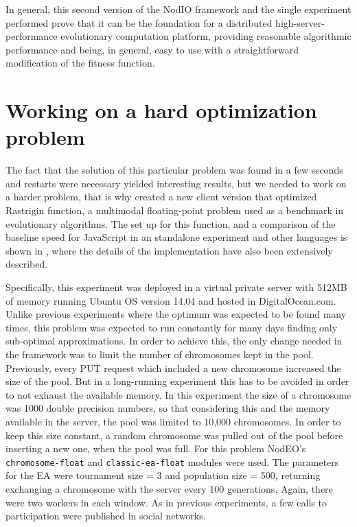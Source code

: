 \documentclass[journal,onecolumn]{IEEEtran}
\begin{document}
In general, this second version of the {\sf NodIO} framework and the
single experiment performed prove that it can be the foundation for a distributed
high-server-performance evolutionary computation platform,
providing reasonable algorithmic performance and being, in general,
easy to use with a straightforward modification of the fitness
function. 

\section{Working on a hard optimization problem}
\label{sec:rastrigin}

The fact that the solution of this particular problem was found in a
few seconds and restarts were necessary yielded interesting results,
but we needed to work on a harder problem, that is why created a new
client version that optimized Rastrigin function, a multimodal
floating-point problem used as a benchmark in evolutionary
algorithms. The set up for this function, and a comparison of the
baseline speed for JavaScript in an standalone experiment and other
languages is shown in \cite{2016arXiv160101607M}, where the details of
the implementation have also been extensively described. 

Specifically, this experiment was deployed in a virtual private server with 512MB of memory
running Ubuntu OS version 14.04 and hosted in DigitalOcean.com. Unlike previous
experiments where the optimum was expected to be found many times, 
this problem was expected to run constantly for many days finding only
sub-optimal approximations. In order to achieve this, the only change needed 
in the framework was to limit the number of chromosomes kept in the pool. 
Previously, every PUT request which included a new chromosome increased 
the size of the pool. But in a long-running experiment this has to be avoided
in order to not exhaust the available memory. In this experiment the size
of a chromosome was 1000 double precision numbers, so that considering this
and the memory available in the server, the pool was limited 
to 10,000 chromosomes.  In order to keep this size
constant, a random chromosome was pulled out of the pool before inserting a
new one, when the pool was full. For this problem {\sf NodEO}'s {\tt chromosome-float} 
and {\tt classic-ea-float} modules were used. The parameters for the EA 
were tournament size = 3 and  population size = 500, returning exchanging a
chromosome with the server every 100 generations. Again, there were two workers in each window.
As in previous experiments, a few calls to participation were published in social networks.
\end{document}
